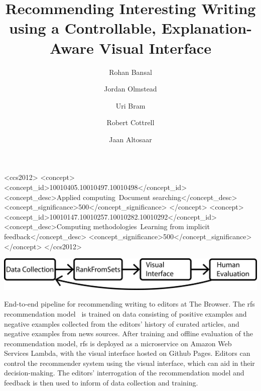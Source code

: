 \documentclass[sigconf]{acmart} %
\title{Recommending Interesting Writing using a Controllable, Explanation-Aware Visual Interface}
\author{Rohan Bansal}
\affiliation{\institution{The Browser}}
\author{Jordan Olmstead}
\affiliation{\institution{The Browser}}
\author{Uri Bram}
\affiliation{\institution{The Browser}}
\author{Robert Cottrell}
\affiliation{\institution{The Browser}}
\author{Jaan Altosaar}
\affiliation{\institution{Princeton University}}
\begin{document}

\begin{CCSXML}
<ccs2012>
   <concept>
       <concept_id>10010405.10010497.10010498</concept_id>
       <concept_desc>Applied computing~Document searching</concept_desc>
       <concept_significance>500</concept_significance>
       </concept>
   <concept>
       <concept_id>10010147.10010257.10010282.10010292</concept_id>
       <concept_desc>Computing methodologies~Learning from implicit feedback</concept_desc>
       <concept_significance>500</concept_significance>
       </concept>
 </ccs2012>
\end{CCSXML}



\begin{teaserfigure}
  \includegraphics[width=\textwidth]{fig/pipeline.pdf}
  \caption{End-to-end pipeline for recommending writing to editors at The Browser. The \acrlong{rfs} recommendation model~\citep{altosaar2020rankfromsets:} is trained on data consisting of positive examples and negative examples collected from the editors' history of curated articles, and negative examples from news sources. After training and offline evaluation of the recommendation model, \acrlong{rfs} is deployed as a microservice on Amazon Web Services Lambda, with the visual interface hosted on Github Pages. Editors can control the recommender system using the visual interface, which can aid in their decision-making. The editors' interrogation of the recommendation model and feedback is then used to inform of data collection and training.}
  \label{fig:pipeline}
\end{teaserfigure}
\end{document}
